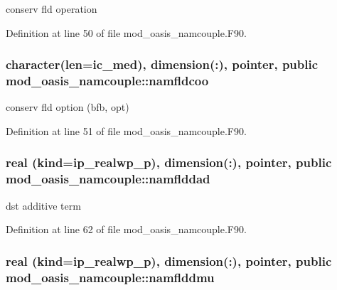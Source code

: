 conserv fld operation 



Definition at line 50 of file mod\+\_\+oasis\+\_\+namcouple.\+F90.

\hypertarget{classmod__oasis__namcouple_a119b86702766d5392cb44856448bcd3e}{
\subsubsection[{namfldcoo}]{\setlength{\rightskip}{0pt plus 5cm}character(len=ic\+\_\+med), dimension(\+:), pointer, public mod\+\_\+oasis\+\_\+namcouple\+::namfldcoo}}\label{classmod__oasis__namcouple_a119b86702766d5392cb44856448bcd3e}


conserv fld option (bfb, opt) 



Definition at line 51 of file mod\+\_\+oasis\+\_\+namcouple.\+F90.

\hypertarget{classmod__oasis__namcouple_af1e31f45ea1cd7a7b64a8a7dc2cec4ee}{
\subsubsection[{namflddad}]{\setlength{\rightskip}{0pt plus 5cm}real (kind=ip\+\_\+realwp\+\_\+p), dimension(\+:), pointer, public mod\+\_\+oasis\+\_\+namcouple\+::namflddad}}\label{classmod__oasis__namcouple_af1e31f45ea1cd7a7b64a8a7dc2cec4ee}


dst additive term 



Definition at line 62 of file mod\+\_\+oasis\+\_\+namcouple.\+F90.

\hypertarget{classmod__oasis__namcouple_ad81bb4f19a71f0fcf8655cb9d39a3380}{
\subsubsection[{namflddmu}]{\setlength{\rightskip}{0pt plus 5cm}real (kind=ip\+\_\+realwp\+\_\+p), dimension(\+:), pointer, public mod\+\_\+oasis\+\_\+namcouple\+::namflddmu}}\label{classmod__oasis__namcouple_ad81bb4f19a71f0fcf8655cb9d39a3380}


